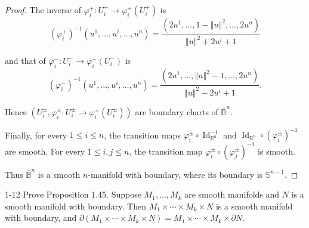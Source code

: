\begin{proof}
    The inverse of \( \varphi_{i}^{+}: U_{i}^{+} \to \varphi_{i}^{+}(U_{i}^{+}) \) is
    \[
        {(\varphi_{i}^{+})}^{-1}(u^{1}, \ldots, u^{i}, \ldots, u^{n}) = \dfrac{(2u^{1}, \ldots, 1 - {\left\Vert u \right\Vert}^{2}, \ldots, 2u^{n})}{{\left\Vert u \right\Vert}^{2} + 2u^{i} + 1}
    \]

    and that of \( \varphi_{i}^{-}: U_{i}^{-} \to \varphi_{i}^{-}(U_{i}^{-}) \) is
    \[
        {(\varphi_{i}^{-})}^{-1}(u^{1}, \ldots, u^{i}, \ldots, u^{n}) = \dfrac{(2u^{1}, \ldots, {\left\Vert u \right\Vert}^{2} - 1, \ldots, 2u^{n})}{{\left\Vert u \right\Vert}^{2} - 2u^{i} + 1}.
    \]

    Hence \( (U_{i}^{\pm}, \varphi_{i}^{\pm}: U_{i}^{\pm} \to \varphi_{i}^{\pm}(U_{i}^{\pm})) \) are boundary charts of \( \overline{\mathbb{B}}^{n} \).

    Finally, for every \( 1 \le i \le n \), the transition maps \( \varphi_{i}^{\pm} \circ \operatorname{Id}_{\mathbb{B}^{n}}^{-1} \) and \( \operatorname{Id}_{\mathbb{B}^{n}} \circ {(\varphi_{i}^{\pm})}^{-1} \) are smooth. For every \( 1 \le i, j \le n \), the transition map \( \varphi_{i}^{\pm} \circ {(\varphi_{j}^{\pm})}^{-1} \) is smooth.

    Thus \( \overline{\mathbb{B}}^{n} \) is a smooth \(n\)-manifold with boundary, where its boundary is \( \mathbb{S}^{n-1} \).
\end{proof}

\begin{problem}{1-12}
    Prove Proposition 1.45. Suppose \( M_{1}, \ldots, M_{k} \) are smooth manifolds and \( N \) is a smooth manifold with boundary. Then \( M_{1} \times \cdots \times M_{k} \times N \) is a smooth manifold with boundary, and \( \partial (M_{1} \times \cdots \times M_{k} \times N) = M_{1} \times \cdots \times M_{k} \times \partial N \).
\end{problem}

